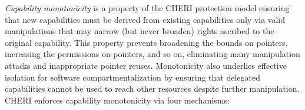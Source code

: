 \textit{Capability monotonicity} is a property of the CHERI protection model
ensuring that new capabilities must be derived
from existing capabilities only via valid manipulations that may narrow (but
never broaden) rights ascribed to the original capability.
This property prevents broadening the bounds on pointers, increasing the
permissions on pointers, and so on, eliminating many manipulation attacks and
inappropriate pointer reuses.
Monotonicity also underlies effective isolation for software
compartmentalization by ensuring that delegated capabilities cannot be used to
reach other resources despite further manipulation.
CHERI enforces capability monotonicity via four mechanisms:


